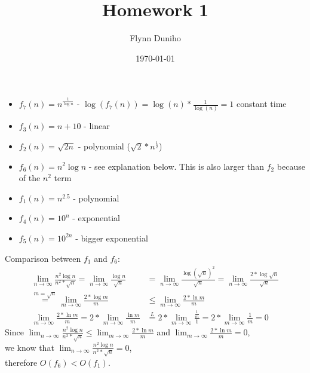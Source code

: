 \documentclass[14pt]{extarticle}
\title{Homework 1}
\author{Flynn Duniho}
\date{\today}
\begin{document}
\maketitle
\tableofcontents
\newpage

\section{}

\begin{itemize}
  \item $f_7(n) = n^{\frac{1}{\log n}}$ - $\log(f_7(n)) = \log(n)*\frac{1}{\log(n)}=1$ constant time
  \item $f_3(n) = n + 10$ - linear
  \item $f_2(n) = \sqrt{2n}$ - polynomial ($\sqrt{2}*n^{\frac{1}{2}}$)
  \item $f_6(n) = n^2\log n$ - see explanation below. This is also larger than $f_2$ because of the $n^2$ term
  \item $f_1(n) = n^{2.5}$ - polynomial
  \item $f_4(n) = 10^n$ - exponential
  \item $f_5(n) = 10^{2n}$ - bigger exponential
\end{itemize}

\noindent
Comparison between $f_1$ and $f_6$:\\
\begin{align*}
  \displaystyle
  \lim_{n \to \infty} \frac{n^2\log n}{n^2*\sqrt n}
  = \lim_{n \to \infty} \frac{\log n}{\sqrt n}
  &= \lim_{n \to \infty} \frac{\log (\sqrt n)^2}{\sqrt n}
  = \lim_{n \to \infty} \frac{2*\log \sqrt n}{\sqrt n}\\
  \overset{m=\sqrt n}{=} \lim_{m \to \infty} \frac{2*\log m}{m}
  &\le \lim_{m \to \infty} \frac{2*\ln m}{m} \\
  \lim_{m \to \infty} \frac{2*\ln m}{m}
  = 2*\lim_{m \to \infty} \frac{\ln m}{m}
  &\overset{L}{=} 2*\lim_{m \to \infty} \frac{\frac{1}{m}}{1}
  = 2*\lim_{m \to \infty} \frac{1}{m} = 0
\end{align*}
Since $\lim_{n \to \infty} \frac{n^2\log n}{n^2*\sqrt n} \le \lim_{m \to \infty} \frac{2*\ln m}{m}$ and $\lim_{m \to \infty} \frac{2*\ln m}{m} = 0$, \\
we know that $\lim_{n \to \infty} \frac{n^2\log n}{n^2*\sqrt n} = 0$,\\
therefore $O(f_6) < O(f_1)$.

\section{}
\end{document}
